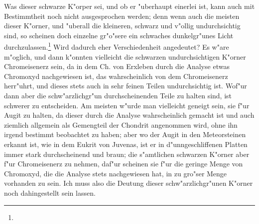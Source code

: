 \documentclass[a4paper, 11pt, oneside]{article}
\begin{document}
Was dieser schwarze K"orper sei, und ob er "uberhaupt einerlei ist, kann auch mit Bestimmtheit noch nicht ausgesprochen werden; denn wenn auch die meisten dieser K"orner, und "uberall die kleineren, schwarz und v"ollig undurchsichtig sind, so scheinen doch einzelne gr"o"sere ein schwaches dunkelgr"unes Licht durchzulassen.\footnote{} Wird dadurch eher Verschiedenheit angedeutet? Es w"are m"oglich, und dann k"onnten vielleicht die schwarzen undurchsichtigen K"orner Chromeisenerz sein, da in dem Ch. von Erxleben durch die Analyse etwas Chromoxyd nachgewiesen ist, das wahrscheinlich von dem Chromeisenerz herr"uhrt, und dieses stets auch in sehr feinen Teilen undurchsichtig ist. Wof"ur dann aber die schw"arzlichgr"un durchscheinenden Teile zu halten sind, ist schwerer zu entscheiden. Am meisten w"urde man vielleicht geneigt sein, sie f"ur Augit zu halten, da dieser durch die Analyse wahrscheinlich gemacht ist und auch ziemlich allgemein als Gemengteil der Chondrit angenommen wird, ohne ihn irgend bestimmt beobachtet zu haben; aber wo der Augit in den Meteorsteinen erkannt ist, wie in dem Eukrit von Juvenas, ist er in d"unngeschliffenen Platten immer stark durchscheinend und braun; die s"amtlichen schwarzen K"orner aber f"ur Chromeisenerz zu nehmen, daf"ur scheinen sie f"ur die geringe Menge von Chromoxyd, die die Analyse stets nachgewiesen hat, in zu gro"ser Menge vorhanden zu sein. Ich muss also die Deutung dieser schw"arzlichgr"unen K"orner noch dahingestellt sein lassen.
\end{document}
